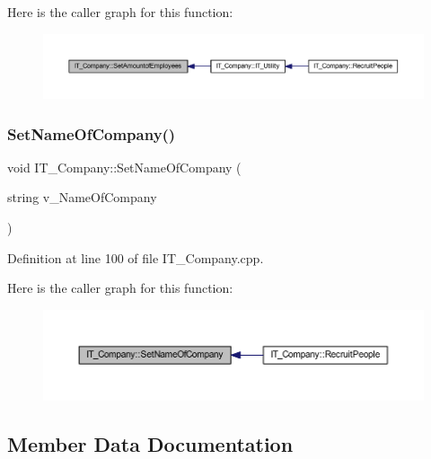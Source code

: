 Here is the caller graph for this function\+:
\nopagebreak
\begin{figure}[H]
\begin{center}
\leavevmode
\includegraphics[width=350pt]{class_i_t___company_a918bdfd512ef8267cf082a20e86a63e9_icgraph}
\end{center}
\end{figure}
\mbox{\label{class_i_t___company_a652c409e38a609c96e788be7687ab744}} 
\subsubsection{\texorpdfstring{Set\+Name\+Of\+Company()}{SetNameOfCompany()}}
{\footnotesize\ttfamily void I\+T\+\_\+\+Company\+::\+Set\+Name\+Of\+Company (\begin{DoxyParamCaption}\item[{string}]{v\+\_\+\+Name\+Of\+Company }\end{DoxyParamCaption})}



Definition at line 100 of file I\+T\+\_\+\+Company.\+cpp.

Here is the caller graph for this function\+:
\nopagebreak
\begin{figure}[H]
\begin{center}
\leavevmode
\includegraphics[width=350pt]{class_i_t___company_a652c409e38a609c96e788be7687ab744_icgraph}
\end{center}
\end{figure}


\subsection{Member Data Documentation}
\mbox{\label{class_i_t___company_a5a839f7995a47589d983fd1990c06a0a}} 
